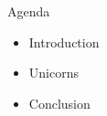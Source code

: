 
\begin{frame}{Agenda}
\begin{itemize}
  \item Introduction
  \item Unicorns
  \item Conclusion
\end{itemize}
\end{frame}

